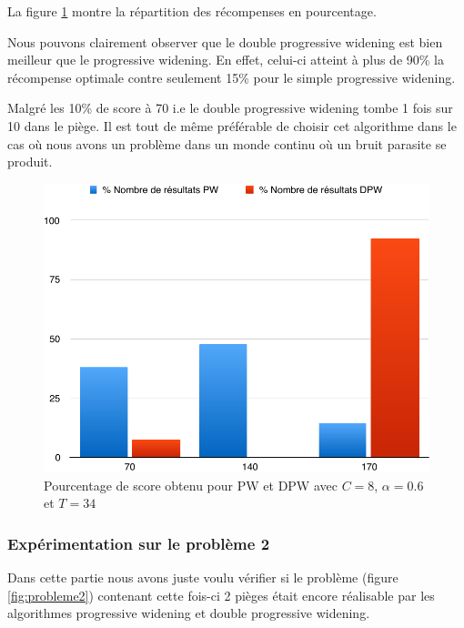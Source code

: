 \documentclass[pdftex,french, english]{article}	%
\begin{document}
    La figure \ref{fig:comparatif_resultat_final_en_pourcent} montre la répartition des récompenses en pourcentage.
    
    Nous pouvons clairement observer que le double progressive widening est bien meilleur que le progressive widening. En effet, celui-ci atteint à plus de 90\% la récompense optimale contre seulement 15\% pour le simple progressive widening. 
    
    Malgré les 10\% de score à 70 i.e le double progressive widening tombe 1 fois sur 10 dans le piège. Il est tout de même préférable de choisir cet algorithme dans le cas où nous avons un problème dans un monde continu où un bruit parasite se produit.
    
      \begin{figure}[H]
		\centering
		\includegraphics[width=\textwidth]{comparatif_resultat_final_en_pourcent.pdf}
		\caption{Pourcentage de score obtenu pour PW et DPW avec $C = 8$, $\alpha = 0.6$ et $T = 34$}
		 \label{fig:comparatif_resultat_final_en_pourcent}
	\end{figure}
    
    
    
    
    \subsubsection{Expérimentation sur le problème 2} \label{exp:resMonde2}
    
    Dans cette partie nous avons juste voulu vérifier si le problème (figure \ref{fig:probleme2}) contenant cette fois-ci 2 pièges était encore réalisable par les algorithmes progressive widening et double progressive widening. 
    
\end{document}

